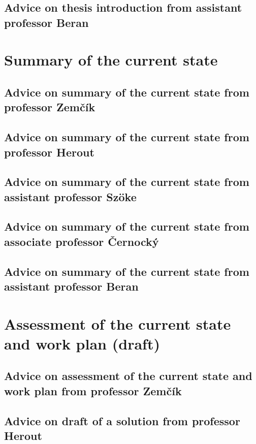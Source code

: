 \subsection*{Advice on thesis introduction from assistant professor Beran}

\section{Summary of the current state}
\label{stav}

\subsection*{Advice on summary of the current state from professor Zemčík}

\subsection*{Advice on summary of the current state from professor Herout}

\subsection*{Advice on summary of the current state from assistant professor Szöke}

\subsection*{Advice on summary of the current state from associate professor Černocký}

\subsection*{Advice on summary of the current state from assistant professor Beran}

\section{Assessment of the current state and work plan (draft)}
\label{navrh}

\subsection*{Advice on assessment of the current state and work plan from professor Zemčík}

\subsection*{Advice on draft of a solution from professor Herout}

